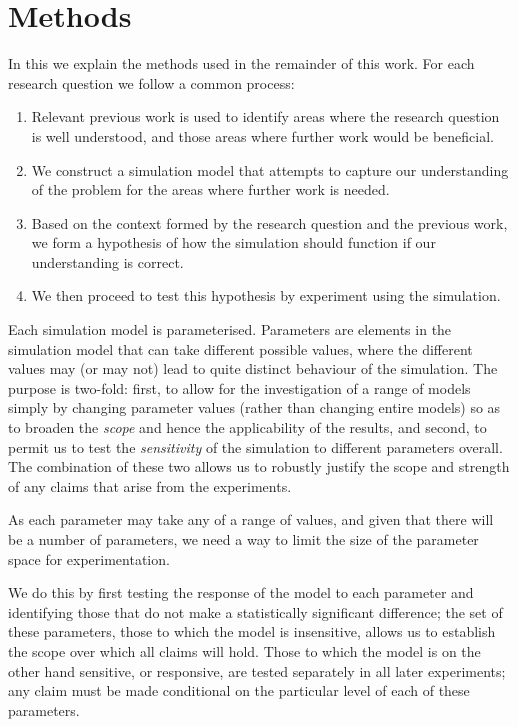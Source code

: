 \section{Methods}\label{methods}

In this  we explain the methods used in the remainder of this work. For each research question we follow a common process:
\begin{enumerate}
	\item Relevant previous work is used to identify areas where the research question is well understood, and those areas where further work would be beneficial.
	\item We construct a simulation model that attempts to capture our understanding of the problem for the areas where further work is needed.
	\item Based on the context formed by the research question and the previous work, we form a hypothesis of how the simulation should function if our understanding is correct.
	\item We then proceed to test this hypothesis by experiment using the simulation.
\end{enumerate}

Each simulation model is parameterised. Parameters are elements in the simulation model that can take different possible values, where the different values may (or may not) lead to quite distinct behaviour of the simulation. The purpose is two-fold: first, to allow for the investigation of a range of models simply by changing parameter values (rather than changing entire models) so as to broaden the \emph{scope} and hence the applicability of the results, and second, to permit us to test the \emph{sensitivity} of the simulation to different parameters overall. The combination of these two allows us to robustly justify the scope and strength of any claims that arise from the experiments.

As each parameter may take any of a range of values, and given that there will be a number of parameters, we need a way to limit the size of the parameter space for experimentation.

We do this by first testing the response of the model to each parameter and identifying those that do not make a statistically significant difference; the set of these parameters, those to which the model is insensitive, allows us to establish the scope over which all claims will hold. Those to which the model is on the other hand sensitive, or responsive, are tested separately in all later experiments; any claim must be made conditional on the particular level of each of these parameters.

